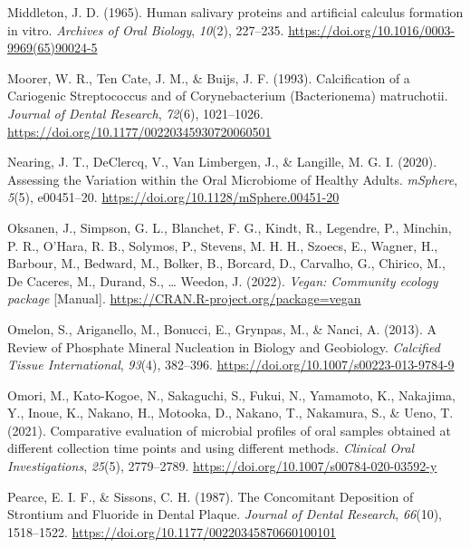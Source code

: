 \documentclass[
  letterpaper,
]{book}
\newlength{\cslhangindent}
\newlength{\cslentryspacingunit} %
\newenvironment{CSLReferences}[2] %
 {%
  \setlength{\parindent}{0pt}
  \ifodd #1
  \let\oldpar\par
  \def\par{\hangindent=\cslhangindent\oldpar}
  \fi
  \setlength{\parskip}{#2\cslentryspacingunit}
 }%
 {}
\begin{document}
\begin{CSLReferences}{1}{0}
\leavevmode{}%
Middleton, J. D. (1965). Human salivary proteins and artificial calculus
formation in vitro. \emph{Archives of Oral Biology}, \emph{10}(2),
227--235. \url{https://doi.org/10.1016/0003-9969(65)90024-5}

\leavevmode{}%
Moorer, W. R., Ten Cate, J. M., \& Buijs, J. F. (1993). Calcification of
a {Cariogenic Streptococcus} and of {Corynebacterium} ({Bacterionema})
matruchotii. \emph{Journal of Dental Research}, \emph{72}(6),
1021--1026. \url{https://doi.org/10.1177/00220345930720060501}

\leavevmode{}%
Nearing, J. T., DeClercq, V., Van Limbergen, J., \& Langille, M. G. I.
(2020). Assessing the {Variation} within the {Oral Microbiome} of
{Healthy Adults}. \emph{mSphere}, \emph{5}(5), e00451--20.
\url{https://doi.org/10.1128/mSphere.00451-20}

\leavevmode{}%
Oksanen, J., Simpson, G. L., Blanchet, F. G., Kindt, R., Legendre, P.,
Minchin, P. R., O'Hara, R. B., Solymos, P., Stevens, M. H. H., Szoecs,
E., Wagner, H., Barbour, M., Bedward, M., Bolker, B., Borcard, D.,
Carvalho, G., Chirico, M., De Caceres, M., Durand, S., \ldots{} Weedon,
J. (2022). \emph{Vegan: {Community} ecology package} {[}Manual{]}.
\url{https://CRAN.R-project.org/package=vegan}

\leavevmode{}%
Omelon, S., Ariganello, M., Bonucci, E., Grynpas, M., \& Nanci, A.
(2013). A {Review} of {Phosphate Mineral Nucleation} in {Biology} and
{Geobiology}. \emph{Calcified Tissue International}, \emph{93}(4),
382--396. \url{https://doi.org/10.1007/s00223-013-9784-9}

\leavevmode{}%
Omori, M., Kato-Kogoe, N., Sakaguchi, S., Fukui, N., Yamamoto, K.,
Nakajima, Y., Inoue, K., Nakano, H., Motooka, D., Nakano, T., Nakamura,
S., \& Ueno, T. (2021). Comparative evaluation of microbial profiles of
oral samples obtained at different collection time points and using
different methods. \emph{Clinical Oral Investigations}, \emph{25}(5),
2779--2789. \url{https://doi.org/10.1007/s00784-020-03592-y}

\leavevmode{}%
Pearce, E. I. F., \& Sissons, C. H. (1987). The {Concomitant Deposition}
of {Strontium} and {Fluoride} in {Dental Plaque}. \emph{Journal of
Dental Research}, \emph{66}(10), 1518--1522.
\url{https://doi.org/10.1177/00220345870660100101}


\end{CSLReferences}
\end{document}
